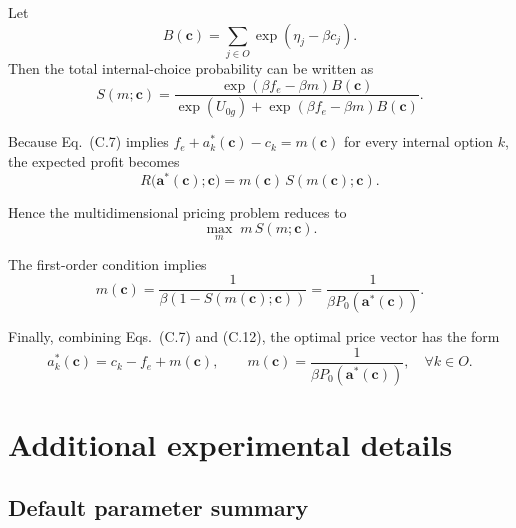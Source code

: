 \documentclass[preprint,12pt,authoryear]{elsarticle}
\begin{document}
Let
\begin{equation}
B(\mathbf{c}) = \sum_{j\in O}\exp(\eta_j-\beta c_j).
\tag{C.8}
\end{equation}
Then the total internal-choice probability can be written as
\begin{equation}
S(m;\mathbf{c}) =
\frac{\exp(\beta f_e-\beta m)B(\mathbf{c})}
{\exp(U_{0g}) + \exp(\beta f_e-\beta m)B(\mathbf{c})}.
\tag{C.9}
\end{equation}

Because Eq.~(C.7) implies $f_e + a_k^{*}(\mathbf{c}) - c_k = m(\mathbf{c})$ for every internal option $k$, the expected profit becomes
\begin{equation}
R\big(\mathbf{a}^{*}(\mathbf{c});\mathbf{c}\big)
=
m(\mathbf{c})\,S(m(\mathbf{c});\mathbf{c}).
\tag{C.10}
\end{equation}

Hence the multidimensional pricing problem reduces to
\begin{equation}
\max_m \; m\,S(m;\mathbf{c}).
\tag{C.11}
\end{equation}

The first-order condition implies
\begin{equation}
m(\mathbf{c}) =
\frac{1}{\beta\left(1-S(m(\mathbf{c});\mathbf{c})\right)}
=
\frac{1}{\beta P_0(\mathbf{a}^{*}(\mathbf{c}))}.
\tag{C.12}
\end{equation}

Finally, combining Eqs.~(C.7) and (C.12), the optimal price vector has the form
\begin{equation}
a_k^{*}(\mathbf{c})
=
c_k - f_e + m(\mathbf{c}),
\qquad
m(\mathbf{c}) = \frac{1}{\beta P_0(\mathbf{a}^{*}(\mathbf{c}))},
\quad \forall k\in O.
\tag{C.13}
\end{equation}

\section{Additional experimental details}
\label{app:addl}

\subsection{Default parameter summary}
\end{document}
